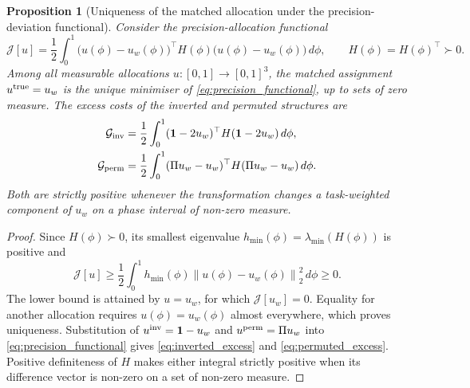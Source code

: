 \documentclass[11pt,a4paper]{article}
\newtheorem{proposition}{Proposition}
\newcommand{\norm}[1]{\left\lVert#1\right\rVert}
\begin{document}
\begin{proposition}[Uniqueness of the matched allocation under the
precision-deviation functional]
\label{prop:precision_structure}
Consider the precision-allocation functional
\begin{equation}
\mathcal J[u]
=\frac12\int_0^1
\big(u(\phi)-u_w(\phi)\big)^\top
H(\phi)
\big(u(\phi)-u_w(\phi)\big)\,d\phi ,
\qquad H(\phi)=H(\phi)^\top\succ0 .
\label{eq:precision_functional}
\end{equation}
Among all measurable allocations $u:[0,1]\rightarrow[0,1]^3$, the matched
assignment $u^{\rm true}=u_w$ is the unique minimiser of
\eqref{eq:precision_functional}, up to sets of zero measure.
The excess costs of the inverted and permuted structures are
\begin{align}
\mathcal G_{\rm inv}
&=\frac12\int_0^1
(\mathbf1-2u_w)^\top H(\mathbf1-2u_w)\,d\phi ,
\label{eq:inverted_excess}\\
\mathcal G_{\rm perm}
&=\frac12\int_0^1
(\Pi u_w-u_w)^\top H(\Pi u_w-u_w)\,d\phi .
\label{eq:permuted_excess}
\end{align}
Both are strictly positive whenever the transformation changes a
task-weighted component of $u_w$ on a phase interval of non-zero measure.
\end{proposition}
\begin{proof}
Since $H(\phi)\succ0$, its smallest eigenvalue
$h_{\min}(\phi)=\lambda_{\min}(H(\phi))$ is positive and
\begin{equation}
\mathcal J[u]
\ge\frac12\int_0^1
h_{\min}(\phi)\norm{u(\phi)-u_w(\phi)}_2^2\,d\phi
\ge0 .
\label{eq:precision_lower_bound}
\end{equation}
The lower bound is attained by $u=u_w$, for which
$\mathcal J[u_w]=0$. Equality for another allocation requires
$u(\phi)=u_w(\phi)$ almost everywhere, which proves uniqueness. Substitution of
$u^{\rm inv}=\mathbf1-u_w$ and $u^{\rm perm}=\Pi u_w$ into
\eqref{eq:precision_functional} gives
\eqref{eq:inverted_excess} and \eqref{eq:permuted_excess}. Positive
definiteness of $H$ makes either integral strictly positive when its difference
vector is non-zero on a set of non-zero measure.
\end{proof}
\end{document}
